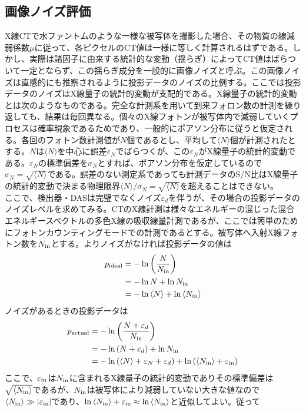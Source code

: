 \subsection{画像ノイズ評価\label{sec:noise}}
X線CTで水ファントムのような一様な被写体を撮影した場合、その物質の線減弱係数$\mu$に従って、各ピクセルのCT値は一様に等しく計算されるはずである。しかし、実際は諸因子に由来する統計的な変動（揺らぎ）によってCT値はばらついて一定とならず、この揺らぎ成分を一般的に画像ノイズと呼ぶ。この画像ノイズは直感的にも推察されるように投影データのノイズの比例する。ここでは投影データのノイズはX線量子の統計的変動が支配的である。X線量子の統計的変動とは次のようなものである。完全な計測系を用いて到来フォロン数の計測を繰り返しても、結果は毎回異なる。個々のX線フォトンが被写体内で減弱していくプロセスは確率現象であるためであり、一般的にポアソン分布に従うと仮定される。各回のフォトン数計測値が$N$個であるとし、平均して$\langle N \rangle$個が計測されたとする。$N$は$\langle N \rangle$を中心に誤差$\varepsilon_N$でばらつくが、この$\varepsilon_N$がX線量子の統計的変動である。$\varepsilon_N$の標準偏差を$\sigma_N$とすれば、ポアソン分布を仮定しているので$\sigma_N=\sqrt{\langle N \rangle}$である。誤差のない測定系であっても計測データのS/N比はX線量子の統計的変動で決まる物理限界$\langle N \rangle/\sigma_N=\sqrt{\langle N \rangle}$を超えることはできない。\\
ここで、検出器・DASは完璧でなくノイズ$\varepsilon_d$を伴うが、その場合の投影データのノイズレベルを求めてみる\cite{mori}。CTのX線計測は様々なエネルギーの混じった混合エネルギースペクトルの多色X線の吸収線量計測であるが、ここでは簡単のためにフォトンカウンティングモードでの計測であるとする。被写体へ入射X線フォトン数を$N_{\rm in}$とする。よりノイズがなければ投影データの値は
\begin{align}
p_{\rm ideal}&=-\ln{\left(\frac{N}{N_{\rm in}}\right)}\\
&=-\ln{N}+\ln{N_{\rm in}}\\
&=-\ln{\langle N \rangle}+\ln{\langle N_{\rm in} \rangle}
\end{align}
ノイズがあるときの投影データは
\begin{align}
p_{\rm actual}&=-\ln{\left( \frac{N+\varepsilon_d}{N_{\rm in}}   \right)}\\
&=-\ln{(N+\varepsilon_d)}+\ln{N_{\rm in}}\\
&=-\ln{(\langle N \rangle + \varepsilon_N + \varepsilon_d)}+\ln{(\langle N_{\rm in} \rangle + \varepsilon_{\rm in})}
\end{align}
ここで、$\varepsilon_{\rm in}$は$N_{\rm in}$に含まれるX線量子の統計的変動でありその標準偏差は$\sqrt{\langle N_{\rm in} \rangle}$であるが、$N_{\rm in}$は被写体により減弱していない大きな値なので$\langle N_{\rm in} \rangle\gg|\varepsilon_{\rm in}|$であり、$\ln{\langle N_{\rm in} \rangle + \varepsilon_{\rm in}}\approx\ln{\langle N_{\rm in} \rangle}$と近似してよい。従って
